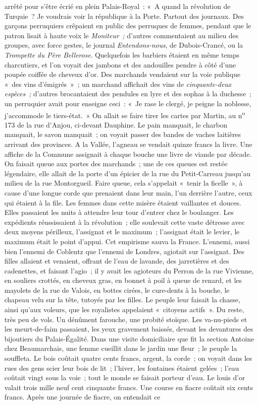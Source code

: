 \documentclass[french,twoside]{book} %
\begin{document}
arrêté pour s’être écrié en plein Palais-Royal : « A quand la révolution de Turquie ? Je voudrais voir la république à la Porte. Partout des journaux. Des garçons perruquiers crêpaient en public des perruques de femmes, pendant que le patron lisait à haute voix le \emph{Moniteur ;} d’autres commentaient au milieu des groupes, avec force gestes, le journal \emph{Entendons-nous}, de Dubois-Crancé, ou la \emph{Trompette du Père Bellerose}. Quelquefois les barbiers étaient en même temps charcutiers, et l’on voyait des jambons et des andouilles pendre à côté d’une poupée coiffée de cheveux d’or. Des marchands vendaient sur la voie publique « des vins d’émigrés » ; un marchand affichait des vins de \emph{cinquante-deux espèces ;} d’autres brocantaient des pendules en lyre et des sophas à la duchesse ; un perruquier avait pour enseigne ceci : « Je rase le clergé, je peigne la noblesse, j’accommode le tiers-état. » On allait se faire tirer les cartes  par Martin, au n\textsuperscript{o} 173 de la rue d’Anjou, ci-devant Dauphine. Le pain manquait, le charbon manquait, le savon manquait ; on voyait passer des bandes de vaches laitières arrivant des provinces. A la Vallée, l’agneau se vendait quinze francs la livre. Une affiche de la Commune assignait à chaque bouche une livre de viande par décade. On faisait queue aux portes des marchands ; une de ces queues est restée légendaire, elle allait de la porte d’un épicier de la rue du Petit-Carreau jusqu’au milieu de la rue Montorgueil. Faire queue, cela s’appelait « tenir la ficelle », à cause d’une longue corde que prenaient dans leur main, l’un derrière l’autre, ceux qui étaient à la file. Les femmes dans cette misère étaient vaillantes et douces. Elles passaient les nuits à attendre leur tour d’entrer chez le boulanger. Les expédients réussissaient à la révolution ; elle soulevait cette vaste détresse avec deux moyens périlleux, l’assignat et le maximum ; l’assignat était le levier, le maximum était le point d’appui. Cet empirisme sauva la France. L’ennemi, aussi bien l’ennemi de Coblentz que l’ennemi de Londres, agiotait sur l’assignat. Des filles allaient et venaient, offrant de l’eau de lavande, des jarretières et des cadenettes, et faisant l’agio ; il y avait les agioteurs du Perron de la rue Vivienne, en souliers crottés, en cheveux gras, en bonnet à poil à queue de renard, et les mayolets de la rue de Valois, en bottes cirées, le cure-dents à la bouche, le chapeau velu sur la tête, tutoyés par les filles. Le peuple leur faisait la chasse, ainsi qu’aux voleurs, que les royalistes appelaient  « citoyens actifs ». Du reste, très peu de vols. Un dénûment farouche, une probité stoïque. Les va-nu-pieds et les meurt-de-faim passaient, les yeux gravement baissés, devant les devantures des bijoutiers du Palais-Égalité. Dans une visite domiciliaire que fit la section Antoine chez Beaumarchais, une femme cueillit dans le jardin une fleur ; le peuple la souffleta. Le bois coûtait quatre cents francs, argent, la corde ; on voyait dans les rues des gens scier leur bois de lit ; l’hiver, les fontaines étaient gelées ; l’eau coûtait vingt sous la voie ; tout le monde se faisait porteur d’eau. Le louis d’or valait trois mille neuf cent cinquante francs. Une course en fiacre coûtait six cents francs. Après une journée de fiacre, on entendait ce 
\end{document}
